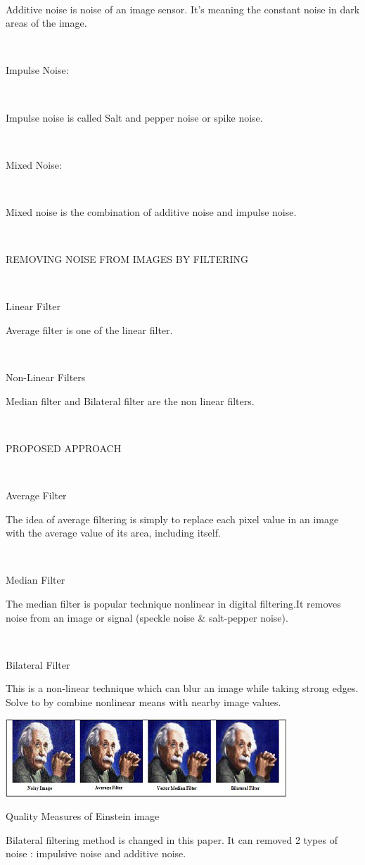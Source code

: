 \

Additive noise is noise of an image sensor. It's meaning the constant noise in dark areas of the image.

\

Impulse Noise:

\

Impulse noise is called Salt and pepper noise or spike noise. 

\

Mixed Noise:

\

Mixed noise is the combination of additive noise and impulse noise.

\

REMOVING NOISE FROM IMAGES BY FILTERING

\

Linear Filter

Average filter is one of the linear filter.

\

Non-Linear Filters

Median filter and Bilateral filter are the non linear filters.

\

PROPOSED APPROACH

\

Average Filter

The idea of average filtering is simply to replace each pixel value in an image with the average value of its area, including itself.

\  

Median Filter

The median filter is popular technique nonlinear in digital filtering.It removes noise from an image or signal (speckle noise \& salt-pepper noise).


\ 

Bilateral Filter

This is a non-linear technique which can blur an image while taking strong edges. Solve to by combine nonlinear means  with nearby image values. 

\vspace{0.1cm}

\begin{center}
\includegraphics{10.png}

 Quality Measures of Einstein image
\end{center}

 Bilateral filtering method is changed in this paper. It can removed 2 types of noise : impulsive noise and additive noise.

